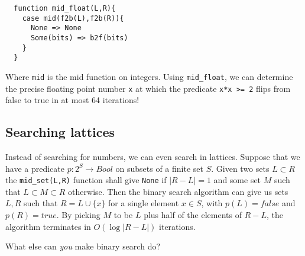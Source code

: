 \documentclass[a4paper, 11pt]{article}
\begin{document}
\begin{lstlisting}
  function mid_float(L,R){
    case mid(f2b(L),f2b(R)){
      None => None
      Some(bits) => b2f(bits)
    }
  }
\end{lstlisting}

\noindent Where \lstinline|mid| is the mid function on integers. Using \lstinline|mid_float|, we can determine the precise floating point number \lstinline|x| at which the predicate \lstinline|x*x >= 2| flips from false to true in at most 64 iterations!

\subsection{Searching lattices}

Instead of searching for numbers, we can even search in lattices. Suppose that we have a predicate $p : 2^S \to Bool$ on subsets of a finite set $S$. Given two sets $L \subset R$ the \lstinline|mid_set(L,R)| function shall give \lstinline|None| if $|R - L| = 1$ and some set $M$ such that $L \subset M \subset R$ otherwise. Then the binary search algorithm can give us sets $L,R$ such that $R = L \cup \{x\}$ for a single element $x\in S$, with $p(L) = false$ and $p(R) = true$. By picking $M$ to be $L$ plus half of the elements of $R - L$, the algorithm terminates in $O(\log |R - L|)$ iterations.

\bigskip

What else can \emph{you} make binary search do?
\end{document}
